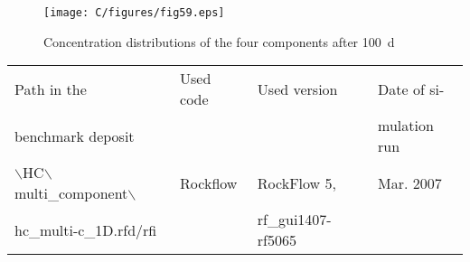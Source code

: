 \begin{figure}[htbp]
\centering
\texttt{[image: C/figures/fig59.eps]}
\caption{Concentration distributions of the four components after 100~d}
\label{fig59}
\end{figure}


\begin{tabular}{|l|l|l|l|}
\hline
Path in the & Used code	& Used version & Date of si- \\
benchmark deposit	& & & mulation run \\
\hline
$\backslash$HC$\backslash$multi\_component$\backslash$ &Rockflow	& RockFlow 5,	& Mar. 2007 \\
hc\_multi-c\_1D.rfd/rfi	&  & rf\_gui1407-rf5065 & \\
\hline	
\end{tabular}
